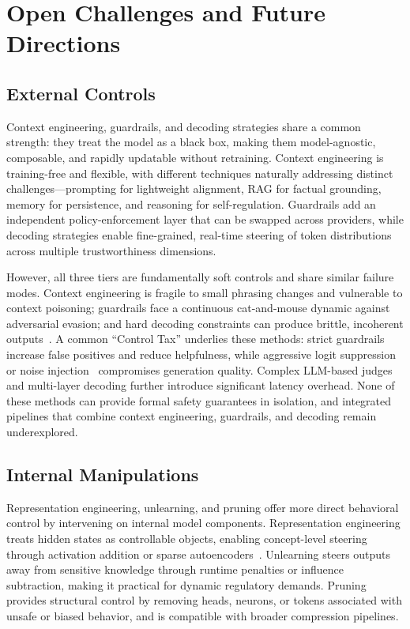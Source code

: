 \section{Open Challenges and Future Directions}
\label{sec:challenges}


\subsection{External Controls}

Context engineering, guardrails, and decoding strategies share a common strength: they treat the model as a black box, making them model-agnostic, composable, and rapidly updatable without retraining. Context engineering is training-free and flexible, with different techniques naturally addressing distinct challenges---prompting for lightweight alignment, RAG for factual grounding, memory for persistence, and reasoning for self-regulation. Guardrails add an independent policy-enforcement layer that can be swapped across providers, while decoding strategies enable fine-grained, real-time steering of token distributions across multiple trustworthiness dimensions.

However, all three tiers are fundamentally soft controls and share similar failure modes. Context engineering is fragile to small phrasing changes and vulnerable to context poisoning; guardrails face a continuous cat-and-mouse dynamic against adversarial evasion; and hard decoding constraints can produce brittle, incoherent outputs~\citep{Huang2024SafeAlignerSA}. A common ``Control Tax'' underlies these methods: strict guardrails increase false positives and reduce helpfulness, while aggressive logit suppression~\citep{Zhao2024AdversarialCD} or noise injection~\citep{Majmudar2022DifferentiallyPD} compromises generation quality. Complex LLM-based judges and multi-layer decoding further introduce significant latency overhead. None of these methods can provide formal safety guarantees in isolation, and integrated pipelines that combine context engineering, guardrails, and decoding remain underexplored.

\subsection{Internal Manipulations}

Representation engineering, unlearning, and pruning offer more direct behavioral control by intervening on internal model components. Representation engineering treats hidden states as controllable objects, enabling concept-level steering through activation addition or sparse autoencoders~\citep{zou2023representation,li2023iti,turner2023steering}. Unlearning steers outputs away from sensitive knowledge through runtime penalties or influence subtraction, making it practical for dynamic regulatory demands. Pruning provides structural control by removing heads, neurons, or tokens associated with unsafe or biased behavior, and is compatible with broader compression pipelines.

